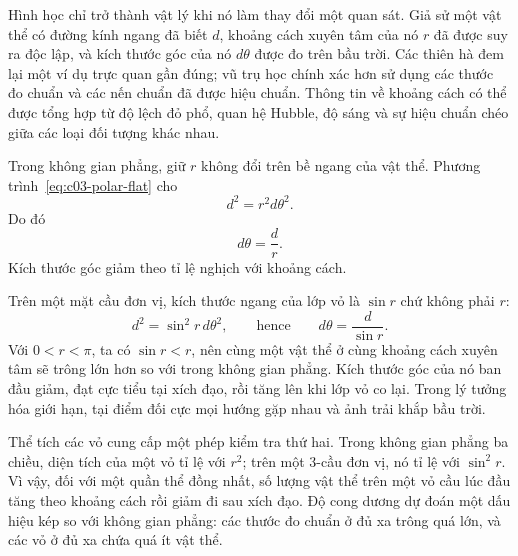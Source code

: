 Hình học chỉ trở thành vật lý khi nó làm thay đổi một quan sát. Giả sử một vật thể có đường kính ngang đã biết \(d\), khoảng cách xuyên tâm của nó \(r\) đã được suy ra độc lập, và kích thước góc của nó \(d\theta\) được đo trên bầu trời. Các thiên hà đem lại một ví dụ trực quan gần đúng; vũ trụ học chính xác hơn sử dụng các thước đo chuẩn và các nến chuẩn đã được hiệu chuẩn. Thông tin về khoảng cách có thể được tổng hợp từ độ lệch đỏ phổ, quan hệ Hubble, độ sáng và sự hiệu chuẩn chéo giữa các loại đối tượng khác nhau.

Trong không gian phẳng, giữ \(r\) không đổi trên bề ngang của vật thể. Phương trình~\eqref{eq:c03-polar-flat} cho
\begin{equation}
d^2 = r^2 d\theta^2.
\label{eq:c03-flat-angle-step}
\end{equation}
Do đó
\begin{equation}
d\theta = \frac{d}{r}.
\label{eq:c03-flat-angle}
\end{equation}
Kích thước góc giảm theo tỉ lệ nghịch với khoảng cách.

Trên một mặt cầu đơn vị, kích thước ngang của lớp vỏ là \(\sin r\) chứ không phải \(r\):
\begin{equation}
d^2 = \sin^2 r\, d\theta^2,
\qquad\text{hence}\qquad
d\theta = \frac{d}{\sin r}.
\label{eq:c03-spherical-angle}
\end{equation}
Với \(0<r<\pi\), ta có \(\sin r<r\), nên cùng một vật thể ở cùng khoảng cách xuyên tâm sẽ trông lớn hơn so với trong không gian phẳng. Kích thước góc của nó ban đầu giảm, đạt cực tiểu tại xích đạo, rồi tăng lên khi lớp vỏ co lại. Trong lý tưởng hóa giới hạn, tại điểm đối cực mọi hướng gặp nhau và ảnh trải khắp bầu trời.

\begin{classroomqa}
\end{classroomqa}

Thể tích các vỏ cung cấp một phép kiểm tra thứ hai. Trong không gian phẳng ba chiều, diện tích của một vỏ tỉ lệ với \(r^2\); trên một \(3\)-cầu đơn vị, nó tỉ lệ với \(\sin^2r\). Vì vậy, đối với một quần thể đồng nhất, số lượng vật thể trên một vỏ cầu lúc đầu tăng theo khoảng cách rồi giảm đi sau xích đạo. Độ cong dương dự đoán một dấu hiệu kép so với không gian phẳng: các thước đo chuẩn ở đủ xa trông quá lớn, và các vỏ ở đủ xa chứa quá ít vật thể.

